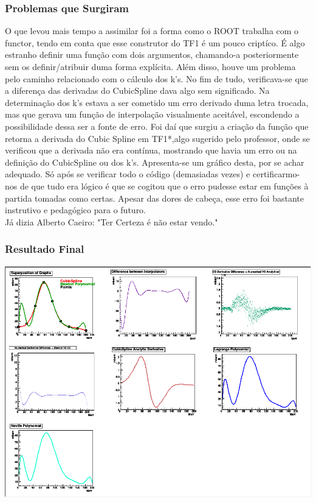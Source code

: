 \documentclass{article}
\begin{document}
\begin{multicols}{2}
  \subsubsection{Problemas que Surgiram}
  O que levou mais tempo a assimilar foi a forma como o ROOT trabalha com o functor, tendo em conta que esse construtor do TF1 é um pouco criptíco. É algo estranho definir uma função com dois argumentos, chamando-a posteriormente sem os definir/atribuir duma forma explícita. Além disso, houve um problema pelo caminho relacionado com o cálculo dos k's. No fim de tudo, verificava-se que a diferença das derivadas do CubicSpline dava algo sem significado. Na determinação dos k's estava a ser cometido um erro derivado duma letra  trocada, mas que gerava um função de interpolação visualmente aceitável, escondendo a possibilidade dessa ser a fonte de erro. Foi daí que surgiu a criação da função que retorna a derivada do Cubic Spline em TF1*,algo sugerido pelo professor, onde se verificou que a derivada não era contínua, mostrando que havia um erro ou na definição do CubicSpline ou dos k's. Apresenta-se um gráfico desta, por se achar adequado. Só após se verificar todo o código (demasiadas vezes) e certificarmo-nos de que tudo era lógico é que se cogitou que o erro pudesse estar em funções à partida tomadas como certas. Apesar das dores de cabeça, esse erro foi bastante instrutivo e pedagógico para o futuro.\\  Já dizia Alberto Caeiro:
  "Ter Certeza é não estar vendo."

  \subsubsection{Resultado Final}
  \begin{center}
    \includegraphics[scale=0.2]{resultados3.png}
  \end{center}


\end{multicols}
\end{document}
